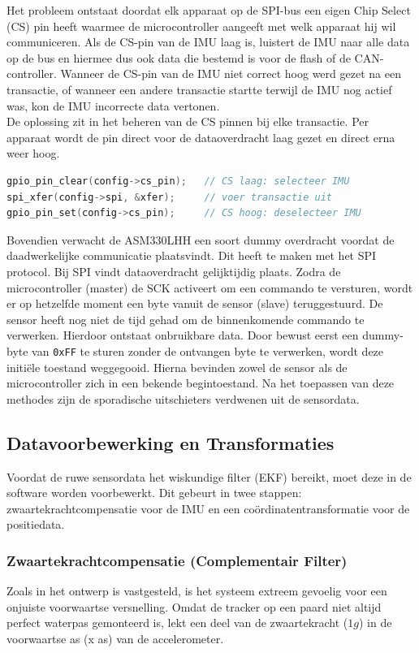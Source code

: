 Het probleem ontstaat doordat elk apparaat op de SPI-bus een eigen Chip Select (CS) pin heeft waarmee de microcontroller aangeeft met welk apparaat hij wil communiceren. Als de CS-pin van de IMU laag is, luistert de IMU naar alle data op de bus en hiermee dus ook data die bestemd is voor de flash of de CAN-controller. Wanneer de CS-pin van de IMU niet correct hoog werd gezet na een transactie, of wanneer een andere transactie startte terwijl de IMU nog actief was, kon de IMU incorrecte data vertonen. \\

De oplossing zit in het beheren van de CS pinnen bij elke transactie. Per apparaat wordt de pin direct voor de dataoverdracht laag gezet en direct erna weer hoog. 

\begin{lstlisting}[language=C]
gpio_pin_clear(config->cs_pin);   // CS laag: selecteer IMU
spi_xfer(config->spi, &xfer);     // voer transactie uit
gpio_pin_set(config->cs_pin);     // CS hoog: deselecteer IMU
\end{lstlisting}

Bovendien verwacht de ASM330LHH een soort dummy overdracht voordat de daadwerkelijke communicatie plaatsvindt. Dit heeft te maken met het SPI protocol. Bij SPI vindt dataoverdracht gelijktijdig plaats. Zodra de microcontroller (master) de SCK activeert om een commando te versturen, wordt er op hetzelfde moment een byte vanuit de sensor (slave) teruggestuurd. De sensor heeft nog niet de tijd gehad om de binnenkomende commando te verwerken. Hierdoor ontstaat onbruikbare data. Door bewust eerst een dummy-byte van \texttt{0xFF} te sturen zonder de ontvangen byte te verwerken, wordt deze initiële toestand weggegooid. Hierna bevinden zowel de sensor als de microcontroller zich in een bekende begintoestand. Na het toepassen van deze methodes zijn de sporadische uitschieters verdwenen uit de sensordata.



\subsection{Datavoorbewerking en Transformaties}
Voordat de ruwe sensordata het wiskundige filter (EKF) bereikt, moet deze in de software worden voorbewerkt. Dit gebeurt in twee stappen: zwaartekrachtcompensatie voor de IMU en een coördinatentransformatie voor de positiedata.
 
\subsubsection{Zwaartekrachtcompensatie (Complementair Filter)}
Zoals in het ontwerp is vastgesteld, is het systeem extreem gevoelig voor een onjuiste voorwaartse versnelling. Omdat de tracker op een paard niet altijd perfect waterpas gemonteerd is, lekt een deel van de zwaartekracht ($1g$) in de voorwaartse as (x as) van de accelerometer. \\
 
